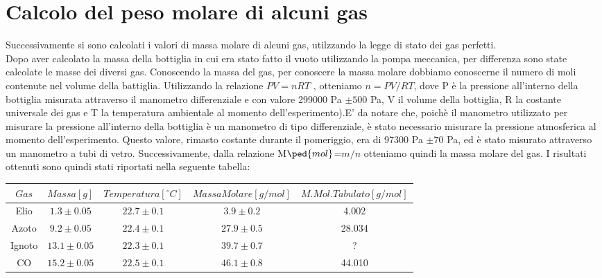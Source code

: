 \documentclass[a4paper,11pt]{article}
\begin{document}
\section{Calcolo del peso molare di alcuni gas}
Successivamente si sono calcolati i valori di massa molare di alcuni gas, utilzzando la legge di stato dei gas perfetti. \\Dopo aver calcolato la massa della bottiglia in cui era stato fatto il vuoto utilizzando la pompa meccanica, per differenza sono state calcolate le masse dei diversi gas. Conoscendo la massa del gas, per conoscere la massa molare dobbiamo conoscerne il numero di moli contenute nel volume della battiglia. Utilizzando la relazione $PV=nRT$ , otteniamo $n=PV/RT$, dove P è la pressione all'interno della bottiglia misurata attraverso il manometro differenziale e con valore 299000 Pa $\pm500$ Pa, V il volume della bottiglia, R la costante universale dei gas e T la temperatura ambientale al momento dell'esperimento).E' da notare che, poichè il manometro utilizzato per misurare la pressione all'interno della bottiglia è un manometro di tipo differenziale, è stato necessario misurare la pressione atmosferica al momento dell'esperimento. Questo valore, rimasto costante durante il pomeriggio, era di 97300 Pa $\pm70$ Pa, ed è stato misurato attraverso un manometro a tubi di vetro. Successivamente, dalla relazione M$\ped{mol}$=$m/n$ otteniamo quindi la massa molare del gas. I risultati ottenuti sono quindi stati riportati nella seguente tabella: 
\hspace{-140pt}

\begin{center}
\begin{tabular}{|c|c|c|c|c|}
\hline \rule[-2ex]{0pt}{5.5ex} $Gas$ & $Massa [g]$ & $Temperatura [^\circ{C}]$ & $Massa Molare [g/mol]$ & $M. Mol. Tabulato [g/mol]$ \\ 
\hline \rule[-2ex]{0pt}{5.5ex} Elio & $1.3 \pm 0.05$ & $22.7 \pm 0.1$ & $3.9 \pm 0.2$ & 4.002 \\ 
\hline \rule[-2ex]{0pt}{5.5ex} Azoto & $9.2 \pm 0.05$ & $22.4 \pm 0.1$ & $27.9 \pm 0.5$ & 28.034 \\ 
\hline \rule[-2ex]{0pt}{5.5ex} Ignoto & $13.1 \pm 0.05$ & $22.3 \pm 0.1$ & $39.7 \pm 0.7$ & ? \\ 
\hline \rule[-2ex]{0pt}{5.5ex} CO\ped2 & $15.2 \pm 0.05$ & $22.5 \pm 0.1$ & $46.1 \pm 0.8$ & 44.010 \\ 
\hline 
\end{tabular}
\end{center}
\vspace{40pt}
\end{document}
